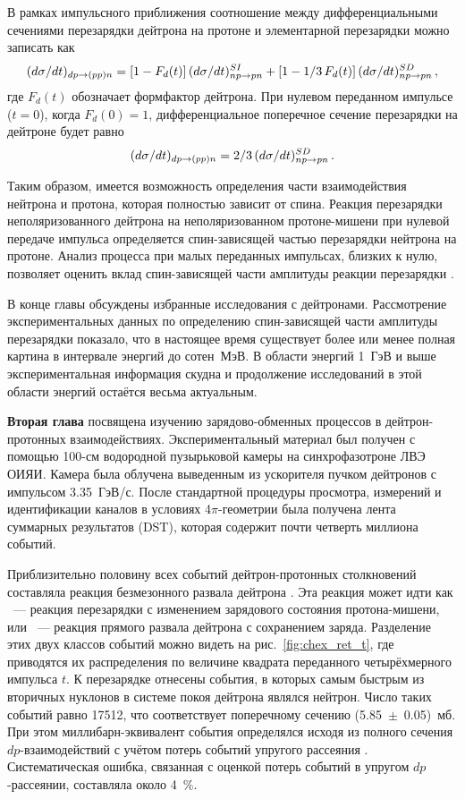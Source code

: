 В рамках импульсного приближения соотношение между дифференциальными сечениями
перезарядки дейтрона на протоне \dpchex и элементарной перезарядки \np можно
записать как
\begin{equation}
  \label{eq:dpnp}
  (d\sigma/dt)_{dp \rightarrow (pp)n} = [1-F_d(t)]\,(d\sigma/dt)^{SI}_{np \rightarrow pn} +
  [1-1/3\,F_d(t)]\,(d\sigma/dt)^{SD}_{np \rightarrow pn}\,,
\end{equation}
где $F_d(t)$ обозначает формфактор дейтрона. При нулевом переданном импульсе
($t=0$), когда $F_d(0) = 1$, дифференциальное поперечное сечение перезарядки на
дейтроне будет равно
\begin{equation}
  \label{eq:dpnp0}
  (d\sigma/dt)_{dp \rightarrow (pp)n} = 2/3\,(d\sigma/dt)^{SD}_{np \rightarrow pn}\,.
\end{equation}

Таким образом, имеется возможность определения части взаимодействия нейтрона и
протона, которая полностью зависит от спина. Реакция перезарядки
неполяризованного дейтрона на неполяризованном протоне-мишени при нулевой
передаче импульса определяется спин-зависящей частью перезарядки нейтрона на
протоне. Анализ процесса \dpchex при малых переданных импульсах, близких к нулю,
позволяет оценить вклад спин-зависящей части амплитуды реакции перезарядки \np.

В конце главы обсуждены избранные исследования с дейтронами. Рассмотрение
экспериментальных данных по определению спин-зависящей части амплитуды \np
перезарядки показало, что в настоящее время существует более или менее полная
картина в интервале энергий до сотен~МэВ. В области энергий 1~ГэВ и выше
экспериментальная информация скудна и продолжение исследований в этой области
энергий остаётся весьма актуальным.

\vspace{1ex}
\textbf{Вторая глава} посвящена изучению зарядово-обменных процессов в
дейтрон-протонных взаимодействиях. Экспериментальный материал был получен с
помощью 100-см водородной пузырьковой камеры на синхрофазотроне ЛВЭ ОИЯИ.
Камера была облучена выведенным из ускорителя пучком дейтронов с импульсом
3.35~ГэВ/с. После стандартной процедуры просмотра, измерений и идентификации
каналов в условиях 4$\pi$-геометрии была получена лента суммарных результатов
(DST), которая содержит почти четверть миллиона событий.

Приблизительно половину всех событий дейтрон-протонных столкновений составляла
реакция безмезонного развала дейтрона \dpfrag. Эта реакция может идти как
\dpchex~--- реакция перезарядки с изменением зарядового состояния
протона-мишени, или \dpret~--- реакция прямого развала дейтрона с сохранением
заряда. Разделение этих двух классов событий можно видеть на
рис.~\ref{fig:chex_ret_t}, где приводятся их распределения по величине квадрата
переданного четырёхмерного импульса $t$. К перезарядке отнесены события, в
которых самым быстрым из вторичных нуклонов в системе покоя дейтрона являлся
нейтрон. Число таких событий равно 17512, что соответствует поперечному сечению
(5.85~$\pm$~0.05)~мб. При этом миллибарн-эквивалент события определялся исходя
из полного сечения $dp$-взаимодействий с учётом потерь событий упругого
рассеяния \dpela. Систематическая ошибка, связанная с оценкой потерь событий в
упругом $dp$-рассеянии, составляла около 4~$\%$.

